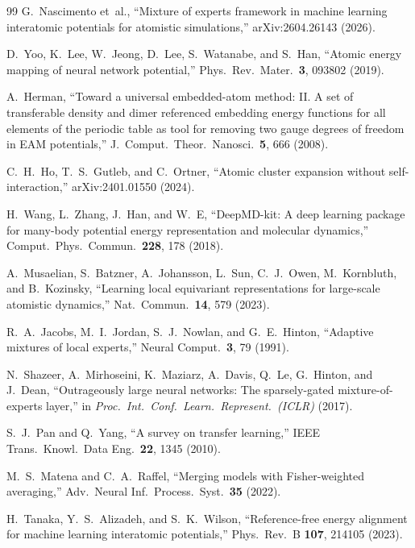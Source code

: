 \documentclass[twoside,prb,aps,floatfix,superscriptaddress,longbibliography]{revtex4-2}
\begin{document}
\begin{thebibliography}{99}
G.~Nascimento et~al., ``Mixture of experts framework in machine learning interatomic potentials for atomistic simulations,'' arXiv:2604.26143 (2026).

D.~Yoo, K.~Lee, W.~Jeong, D.~Lee, S.~Watanabe, and S.~Han, ``Atomic energy mapping of neural network potential,'' Phys.\ Rev.\ Mater.\ \textbf{3}, 093802 (2019).

A.~Herman, ``Toward a universal embedded-atom method: II. A set of transferable density and dimer referenced embedding energy functions for all elements of the periodic table as tool for removing two gauge degrees of freedom in EAM potentials,'' J.\ Comput.\ Theor.\ Nanosci.\ \textbf{5}, 666 (2008).

C.~H.~Ho, T.~S.~Gutleb, and C.~Ortner, ``Atomic cluster expansion without self-interaction,'' arXiv:2401.01550 (2024).

H.~Wang, L.~Zhang, J.~Han, and W.~E, ``DeepMD-kit: A deep learning package for many-body potential energy representation and molecular dynamics,'' Comput.\ Phys.\ Commun.\ \textbf{228}, 178 (2018).

A.~Musaelian, S.~Batzner, A.~Johansson, L.~Sun, C.~J.~Owen, M.~Kornbluth, and B.~Kozinsky, ``Learning local equivariant representations for large-scale atomistic dynamics,'' Nat.\ Commun.\ \textbf{14}, 579 (2023).

R.~A.~Jacobs, M.~I.~Jordan, S.~J.~Nowlan, and G.~E.~Hinton, ``Adaptive mixtures of local experts,'' Neural Comput.\ \textbf{3}, 79 (1991).

N.~Shazeer, A.~Mirhoseini, K.~Maziarz, A.~Davis, Q.~Le, G.~Hinton, and J.~Dean, ``Outrageously large neural networks: The sparsely-gated mixture-of-experts layer,'' in \textit{Proc.\ Int.\ Conf.\ Learn.\ Represent.\ (ICLR)} (2017).

S.~J.~Pan and Q.~Yang, ``A survey on transfer learning,'' IEEE Trans.\ Knowl.\ Data Eng.\ \textbf{22}, 1345 (2010).

M.~S.~Matena and C.~A.~Raffel, ``Merging models with Fisher-weighted averaging,'' Adv.\ Neural Inf.\ Process.\ Syst.\ \textbf{35} (2022).

H.~Tanaka, Y.~S.~Alizadeh, and S.~K.~Wilson, ``Reference-free energy alignment for machine learning interatomic potentials,'' Phys.\ Rev.\ B \textbf{107}, 214105 (2023).


\end{thebibliography}
\end{document}
